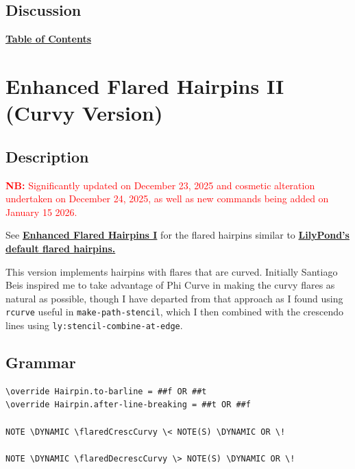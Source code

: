 \subsection{Discussion}


\hyperref[sec:toc]{\textbf{Table of Contents}}
\vfill \break





\section {Enhanced Flared Hairpins II (Curvy Version)}
\label{sec:enhanced_flared_hairpins_2}
\hfill
{}
\hfill

\subsection{Description}

\textcolor{red}{\textbf{NB: }Significantly updated on December 23, 2025 and cosmetic alteration undertaken on December 24, 2025, as well as new commands being added on January 15 2026.}

See \hyperref[sec:enhanced_flared_hairpins_1]{\textbf{Enhanced Flared Hairpins I}} for the flared hairpins similar to \href{https://lilypond.org/doc/v2.24/Documentation/snippets/expressive-marks#expressive-marks-printing-hairpins-in-various-styles}{\textbf{LilyPond's default flared hairpins.}}

This version implements hairpins with flares that are curved. Initially Santiago Beis inspired me to take advantage of Phi Curve in making the curvy flares as natural as possible, though I have departed from that approach as I found using \verb|rcurve| useful in \verb|make-path-stencil|, which I then combined with the crescendo lines using \verb|ly:stencil-combine-at-edge|.

\subsection{Grammar}
\begin{verbatim}
\override Hairpin.to-barline = ##f OR ##t
\override Hairpin.after-line-breaking = ##t OR ##f

NOTE \DYNAMIC \flaredCrescCurvy \< NOTE(S) \DYNAMIC OR \!

NOTE \DYNAMIC \flaredDecrescCurvy \> NOTE(S) \DYNAMIC OR \!
\end{verbatim}

